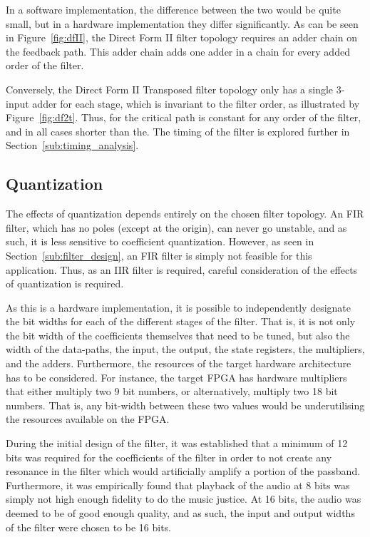 \documentclass[]{article}
\begin{document}
In a software implementation, the difference between the two would be quite small, but in a hardware implementation they differ significantly. As can be seen in Figure~\ref{fig:dfII}, the Direct Form II filter topology requires an adder chain on the feedback path. This adder chain adds one adder in a chain for every added order of the filter.

Conversely, the Direct Form II Transposed filter topology only has a single 3-input adder for each stage, which is invariant to the filter order, as illustrated by Figure~\ref{fig:df2t}.
Thus, for the critical path is constant for any order of the filter, and in all cases shorter than the. The timing of the filter is explored further in Section~\ref{sub:timing_analysis}.


\clearpage

\subsection{Quantization} %
\label{sub:quantization}

The effects of quantization depends entirely on the chosen filter topology. An FIR filter, which has no poles (except at the origin), can never go unstable, and as such, it is less sensitive to coefficient quantization. However, as seen in Section~\ref{sub:filter_design}, an FIR filter is simply not feasible for this application. Thus, as an IIR filter is required, careful consideration of the effects of quantization is required.

As this is a hardware implementation, it is possible to independently designate the bit widths for each of the different stages of the filter. That is, it is not only the bit width of the coefficients themselves that need to be tuned, but also the width of the data-paths, the input, the output, the state registers, the multipliers, and the adders. Furthermore, the resources of the target hardware architecture has to be considered.
For instance, the target FPGA has hardware multipliers that either multiply two 9 bit numbers, or alternatively, multiply two 18 bit numbers. That is, any bit-width between these two values would be underutilising the resources available on the FPGA.

During the initial design of the filter, it was established that a minimum of 12 bits was required for the coefficients of the filter in order to not create any resonance in the filter which would artificially amplify a portion of the passband.
Furthermore, it was empirically found that playback of the audio at 8 bits was simply not high enough fidelity to do the music justice. At 16 bits, the audio was deemed to be of good enough quality, and as such, the input and output widths of the filter were chosen to be 16 bits.
\end{document}
